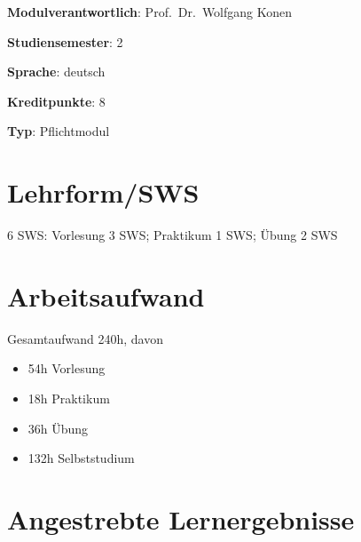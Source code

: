 \begin{modulHead}
\textbf{Modulverantwortlich}: Prof.~Dr.~Wolfgang
Konen
\end{modulHead}
\begin{modulHead}
\textbf{Studiensemester}:
2
\end{modulHead}
\begin{modulHead}
\textbf{Sprache}:
deutsch
\end{modulHead}
\begin{modulHead}
\textbf{Kreditpunkte}:
8
\end{modulHead}
\begin{modulHead}
\textbf{Typ}:
Pflichtmodul
\end{modulHead}


\hypertarget{lehrformswspathlabelmi-2017modulbeschreibungen-bachelorba_mathematik2}{%
\section*{Lehrform/SWS\label{/mi-2017/modulbeschreibungen-bachelor/BA_Mathematik2}}\label{lehrformswspathlabelmi-2017modulbeschreibungen-bachelorba_mathematik2}}

6 SWS: Vorlesung 3 SWS; Praktikum 1 SWS; Übung 2 SWS

\hypertarget{arbeitsaufwandpathlabelmi-2017modulbeschreibungen-bachelorba_mathematik2}{%
\section*{Arbeitsaufwand\label{/mi-2017/modulbeschreibungen-bachelor/BA_Mathematik2}}\label{arbeitsaufwandpathlabelmi-2017modulbeschreibungen-bachelorba_mathematik2}}

Gesamtaufwand 240h, davon

\begin{itemize}
\tightlist
\item
  54h Vorlesung
\item
  18h Praktikum
\item
  36h Übung
\item
  132h Selbststudium
\end{itemize}

\hypertarget{angestrebte-lernergebnissepathlabelmi-2017modulbeschreibungen-bachelorba_mathematik2}{%
\section*{Angestrebte
Lernergebnisse\label{/mi-2017/modulbeschreibungen-bachelor/BA_Mathematik2}}\label{angestrebte-lernergebnissepathlabelmi-2017modulbeschreibungen-bachelorba_mathematik2}}

